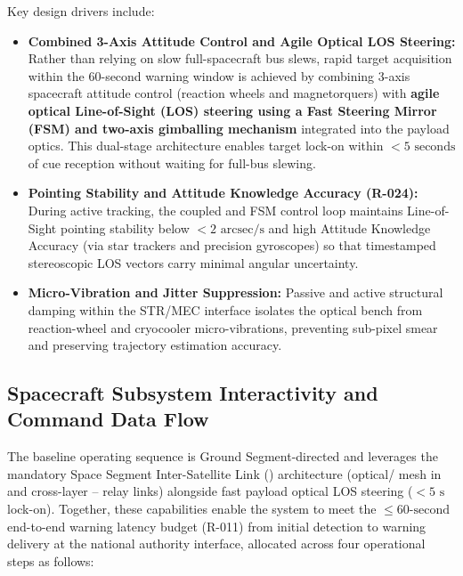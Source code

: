 Key design drivers include:
\begin{itemize}
    \item \textbf{Combined 3-Axis Attitude Control and Agile Optical LOS Steering:} Rather than relying on slow full-spacecraft bus slews, rapid target acquisition within the 60-second warning window is achieved by combining 3-axis spacecraft attitude control (reaction wheels and magnetorquers) with \textbf{agile optical Line-of-Sight (LOS) steering using a Fast Steering Mirror (FSM) and two-axis gimballing mechanism} integrated into the payload optics. This dual-stage architecture enables target lock-on within $< 5\text{ seconds}$ of cue reception without waiting for full-bus slewing.
    \item \textbf{Pointing Stability and Attitude Knowledge Accuracy (R-024):} During active tracking, the coupled  and FSM control loop maintains Line-of-Sight pointing stability below $< 2\text{ arcsec/s}$ and high Attitude Knowledge Accuracy (via star trackers and precision gyroscopes) so that timestamped stereoscopic LOS vectors carry minimal angular uncertainty.
    \item \textbf{Micro-Vibration and Jitter Suppression:} Passive and active structural damping within the STR/MEC interface isolates the optical bench from reaction-wheel and cryocooler micro-vibrations, preventing sub-pixel smear and preserving trajectory estimation accuracy.
\end{itemize}

\subsection{Spacecraft Subsystem Interactivity and Command Data Flow}
The baseline operating sequence is Ground Segment-directed and leverages the mandatory Space Segment Inter-Satellite Link () architecture (optical/  mesh in  and cross-layer -- relay links) alongside fast payload optical LOS steering ($< 5\text{ s}$ lock-on). Together, these capabilities enable the system to meet the $\le 60\text{-second}$ end-to-end warning latency budget (R-011) from initial  detection to warning delivery at the national authority interface, allocated across four operational steps as follows:

